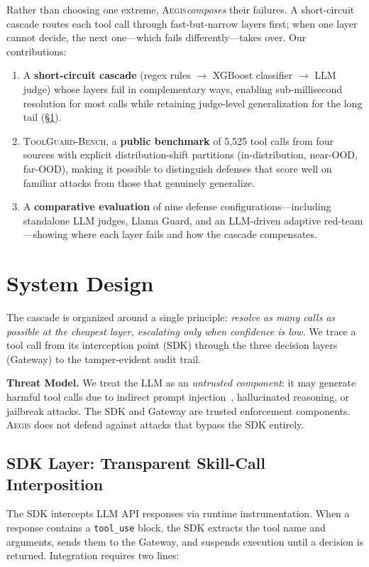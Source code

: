 \documentclass[sigplan,review,anonymous]{acmart}
\newcommand{\system}{\textsc{Aegis}\xspace}
\newcommand{\bench}{\textsc{ToolGuard-Bench}\xspace}
\begin{document}
Rather than choosing one extreme, \system \emph{composes} their failures.
A short-circuit cascade routes each tool call through fast-but-narrow layers first; when one layer cannot decide, the next one---which fails differently---takes over.
Our contributions:
\begin{enumerate}[nolistsep,leftmargin=*]
\item A \textbf{short-circuit cascade} (regex rules $\to$ XGBoost classifier $\to$ LLM judge) whose layers fail in complementary ways, enabling sub-millisecond resolution for most calls while retaining judge-level generalization for the long tail (\S\ref{sec:arch}).
\item \bench, a \textbf{public benchmark} of 5{,}525 tool calls from four sources with explicit distribution-shift partitions (in-distribution, near-OOD, far-OOD), making it possible to distinguish defenses that score well on familiar attacks from those that genuinely generalize.
\item A \textbf{comparative evaluation} of nine defense configurations---including standalone LLM judges, Llama Guard, and an LLM-driven adaptive red-team---showing where each layer fails and how the cascade compensates.
\end{enumerate}

\section{System Design}
\label{sec:arch}

The cascade is organized around a single principle: \emph{resolve as many calls as possible at the cheapest layer, escalating only when confidence is low.}
We trace a tool call from its interception point (SDK) through the three decision layers (Gateway) to the tamper-evident audit trail.

\noindent\textbf{Threat Model.}
We treat the LLM as an \emph{untrusted component}: it may generate harmful tool calls due to indirect prompt injection~\cite{greshake2023not}, hallucinated reasoning, or jailbreak attacks. The SDK and Gateway are trusted enforcement components. \system does not defend against attacks that bypass the SDK entirely.

\subsection{SDK Layer: Transparent Skill-Call Interposition}
\label{sdk-layer}

The SDK intercepts LLM API responses via runtime instrumentation. When a response contains a \texttt{tool\_use} block, the SDK extracts the tool name and arguments, sends them to the Gateway, and suspends execution until a decision is returned. Integration requires two lines:
\end{document}
